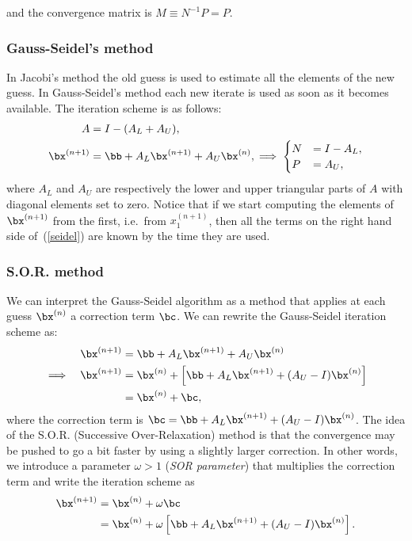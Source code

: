 %
and the convergence matrix is $M \equiv N^{-1} P = P$.

\subsubsection{Gauss-Seidel's method}

In Jacobi's method the old guess is used to estimate all the
elements of the new guess.   In Gauss-Seidel's method each new iterate
is used as soon as it becomes available.    The iteration scheme is as
follows:
%
\begin{align}
  A &= I - (A_L+A_U) , \nonumber \\
  \bx^{(n+1)} &= \bb + A_L \bx^{(n+1)} + A_U \bx^{(n)} , \implies
  \begin{cases}
    N &= I - A_L , \\ P &= A_U ,
  \end{cases}
  \label{seidel}
\end{align}
%
where $A_L$ and $A_U$ are respectively the  lower and upper triangular
parts of $A$ with diagonal elements  set to zero.   Notice that if we
start computing  the   elements   of $\bx^{(n+1)}$ from     the first,
i.e.\ from  $x_1^{(n+1)}$, then all the  terms  on the  right hand side
of~(\ref{seidel}) are known by the time they are used.

\subsubsection{S.O.R. method}

We can interpret the Gauss-Seidel algorithm as a method that applies
at each guess $\bx^{(n)}$ a correction term $\bc$.  We can rewrite the
Gauss-Seidel iteration scheme as:
%
\begin{align*}
  && \bx^{(n+1)} & = \bb + A_L \bx^{(n+1)} + A_U \bx^{(n)} \\
  \implies && \bx^{(n+1)} & = \bx^{(n)} + \left [ \bb + A_L \bx^{(n+1)}
    + (A_U - I) \bx^{(n)} \right ] \\
  &&             & = \bx^{(n)} + \bc,
\end{align*}
%
where the correction term is $\bc = \bb + A_L \bx^{(n+1)} + (A_U - I)
\bx^{(n)}$.  The idea of the S.O.R. (Successive Over-Relaxation)
method is that the convergence may be pushed to go a bit faster by
using a slightly larger correction.  In other words, we introduce a
parameter $\omega > 1$ (\textit{SOR parameter}) that multiplies the
correction term and write the iteration scheme as
%
\begin{align*}
  \bx^{(n+1)} & =  \bx^{(n)} + \omega \bc \\
              & =  \bx^{(n)} + \omega
        \left [ \bb + A_L \bx^{(n+1)} + (A_U - I) \bx^{(n)} \right ].
\end{align*}

